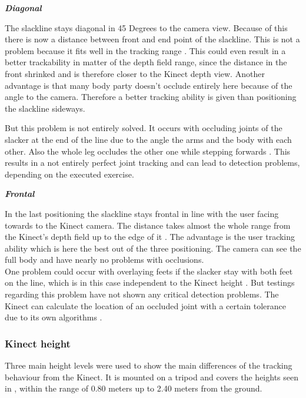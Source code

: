 \textit{\textbf{Diagonal}}

The slackline stays diagonal in 45 Degrees to the camera view. Because of this there is now a distance between front and end point of the slackline. This is not a problem because it fits well in the tracking range \textbf{}. This could even result in a better trackability in matter of the depth field range, since the distance in the front shrinked and is therefore closer to the Kinect depth view. Another advantage is that many body party doesn't occlude entirely here because of the angle to the camera. Therefore a better tracking ability is given than positioning the slackline sideways.

But this problem is not entirely solved. It occurs with occluding joints of the slacker at the end of the line due to the angle the arms and the body \textbf{} with each other. Also the whole leg occludes the other one while stepping forwards \textbf{}. This results in a not entirely perfect joint tracking and can lead to detection problems, depending on the executed exercise.

\textit{\textbf{Frontal}}

In the last positioning the slackline stays frontal in line with the user facing towards to the Kinect camera. The distance takes almost the whole range from the Kinect’s depth field up to the edge of it \textbf{}. The advantage is the user tracking ability which is here the best out of the three positioning. The camera can see the full body and have nearly no problems with occlusions.\\
One problem could occur with overlaying feets if the slacker stay with both feet on the line, which is in this case independent to the Kinect height \textbf{}. But testings regarding this problem have not shown any critical detection problems. The Kinect can calculate the location of an occluded joint with a certain tolerance due to its own algorithms \textbf{\todo{[CITE]}}.

\subsubsection{Kinect height}
Three main height levels were used to show the main differences of the tracking behaviour from the Kinect. It is mounted on a tripod and covers the heights seen in \textbf{}, within the range of 0.80 meters up to 2.40 meters from the ground. 

